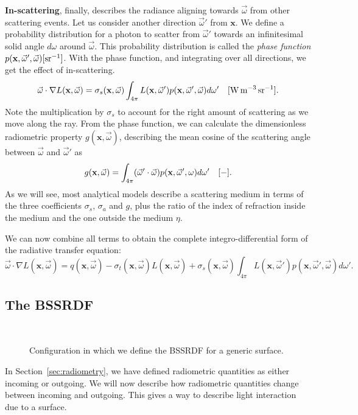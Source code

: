 \textbf{In-scattering}, finally, describes the radiance aligning towards $\vec{\omega}$ from other scattering events. Let us consider another direction $\vec{\omega}'$ from $\mathbf{x}$. We define a probability distribution for a photon to scatter from $\vec{\omega}'$ towards an infinitesimal solid angle $d{\omega}$ around $\vec{\omega}$. This probability distribution is called the \emph{phase function}  $p(\mathbf{x}, \vec{\omega}', \vec{\omega}) \siunitnospace{ \per \steradian}$. With the phase function, and integrating over all directions, we get the effect of in-scattering.
\begin{equation*}
\vec{\omega} \cdot \nabla L(\mathbf{x}, \vec{\omega}) = \sigma_s(\mathbf{x}, \vec{\omega}) \int_{4\pi} L(\mathbf{x}, \vec{\omega}')  p(\mathbf{x}, \vec{\omega}', \vec{\omega}) d {\omega}'\siunit{\watt \per \cubic \metre \per \steradian}.
\end{equation*}
Note the multiplication by $\sigma_s$ to account for the right amount of scattering as we move along the ray. From the phase function, we can calculate the dimensionless radiometric property $g(\mathbf{x}, \vec{\omega})$, describing the mean cosine of the scattering angle between $\vec{\omega}$ and $\vec{\omega}'$ as
\begin{equation*}
g(\mathbf{x}, \vec{\omega}) = \int_{4\pi} (\vec{\omega}' \cdot \vec{\omega}) p(\mathbf{x}, \vec{\omega}', {\omega}) d{\omega}'
\ \ \ [\SI{}{-}].
\end{equation*}
As we will see, most analytical models describe a scattering medium in terms of the three coefficients $\sigma_s$, $\sigma_a$ and $g$, plus the ratio of the index of refraction inside the medium and the one outside the medium $\eta$.

We can now combine all terms to obtain the complete integro-differential form of the radiative transfer equation:
\begin{equation}
\label{eq:rte}
\vec{\omega} \cdot \nabla L(\mathbf{x}, \vec{\omega}) = q(\mathbf{x}, \vec{\omega}) - \sigma_t(\mathbf{x}, \vec{\omega}) L(\mathbf{x}, \vec{\omega}) + \sigma_s(\mathbf{x}, \vec{\omega}) \int_{4\pi} L(\mathbf{x}, \vec{\omega}')  p(\mathbf{x}, \vec{\omega}', \vec{\omega}) d {\omega}'.
\end{equation}
%
\subsection{The BSSRDF}
\label{sec:bssrdfgeneral}
\begin{figure}
\centering
   \def\svgwidth{0.8\textwidth}
    \\
\caption{Configuration in which we define the BSSRDF for a generic surface.} %
\label{fig:bssrdf_configuration}
\end{figure}
%
In Section~\ref{sec:radiometry}, we have defined radiometric quantities as either incoming or outgoing. We will now describe how radiometric quantities change between incoming and outgoing. This gives a way to describe light interaction due to a surface.

